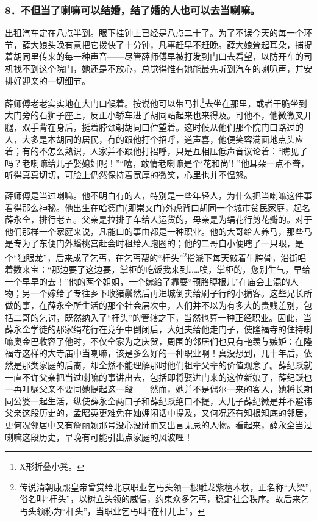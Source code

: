 \subsubsection*{8．不但当了喇嘛可以结婚，结了婚的人也可以去当喇嘛。}
\par 出租汽车定在八点半到。眼下挂钟上已经是八点二十了。为了不误今天的每一个环节，薛大娘头晚有意把它拨快了十分钟，凡事赶早不赶晚。薛大娘耸起耳朵，捕捉着胡同里传来的每一种声音——尽管薛师傅早被打发到门口去看望，以防开车的司机找不到这个院门，她还是不放心，总觉得惟有她能最先听到汽车的喇叭声，并安排好迎亲的一切细节。
\par 薛师傅老老实实地在大门口候着。按说他可以带马扎\footnote{X形折叠小凳。}去坐在那里，或者干脆坐到大门旁的石狮子座上，反正小轿车进了胡同站起来也来得及。可他不，他微微叉开腿，双手背在身后，挺着脖颈朝胡同口伫望着。这时候从他们那个院门口路过的人，大多是本胡同的居民，有的跟他打个招呼，道声喜，他便笑容满面地点头应着；有的不怎么熟识，人家并不跟他打招呼，只是互相压低声音议论着：“瞧见了吗？老喇嘛给儿子娶媳妇呢！”“嘻，敢情老喇嘛是个‘花和尚’! ”他耳朵一点不聋，听得真真切切，可脸上仍然保持着宽厚的微笑，心里也并不愠怒。
\par 薛师傅是当过喇嘛。他不明白有的人，特别是一些年轻人，为什么把当喇嘛这件事看得那么神秘。他出生在哈德门(即崇文门)外虎背口胡同一个城市贫民家庭，起名薛永全，排行老五。父亲是拉排子车给人运货的，母亲是为绢花行剪花瓣的。对于他们那样一个家庭来说，凡能口的事由都是一种职业。他的大哥给人养马，那些马是专为了东便门外蟠桃宫赶会时租给人跑圈的；他的二哥自小便瞎了一只眼，是个“独眼龙”，后来成了乞丐，在乞丐帮的“杆头”\footnote{传说清朝康熙皇帝曾赏给北京职业乞丐头领一根雕龙紫檀木杖，正名称“大梁”,俗名叫“杆头”，以树立头领的威信，约束众多乞丐，稳定社会秩序。故后来乞丐头领称为“杆头”，当职业乞丐叫“在杆儿上”。}指派下每天敲着牛胯骨，沿街唱着数来宝：“那边要了这边要，掌柜的吃饭我来到……唉，掌柜的，您别生气，早给一个早早的去！”他的两个姐姐，一个嫁给了靠耍“顸胳膊根儿”在庙会上混的人物；另一个嫁给了专往乡下收猪鬃然后再进城倒卖给刷子行的小掮客。这些兄长所做的事，在薛永全所生活的那个社会层次中，人们并不以为有多大的贵贱差别，包括二哥的乞讨，既然纳入了“杆头”的管辖之下，当然也算一种正经职业。因此，当薛永全学徒的那家绢花行在竞争中倒闭后，大姐夫给他走门子，使隆福寺的住持喇嘛奥金巴收容了他时，不仅全家为之庆贺，周围的邻居们也只有艳羡与嫉妒：在隆福寺这样的大寺庙中当喇嘛，该是多么好的一种职业啊！真没想到，几十年后，依然是那类家庭的后裔，却全然不能理解那时他们祖辈父辈的价值观念了。薛纪跃就一直不许父亲把当过喇嘛的事讲出去，包括即将娶进门来的这位新娘子，薛纪跃也一再叮嘱父亲不要同她提起这一段——然而，她并不是偶尔一来的客人，她将长期同公婆一起生活，纵使薛永全两口子和薛纪跃绝口不提，大儿子薛纪徽是并不避讳父亲这段历史的，孟昭英更难免在妯娌闲话中提及，又何况还有知根知底的邻居，更何况邻居中又有詹丽颖那号没心没肺而又出言无忌的人物。看起来，薛永全当过喇嘛这段历史，早晚有可能引出点家庭的风波哩！
